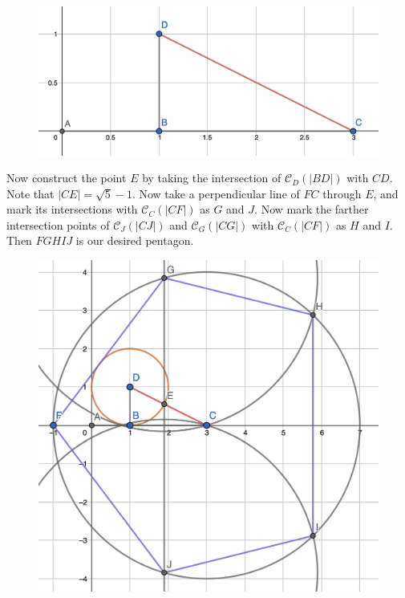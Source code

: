 \documentclass[twoside,10pt]{article}
\begin{document}
\begin{figure}[H]
	\centering
	\includegraphics[scale=0.3]{fig/33a}
\end{figure}

Now construct the point $E$ by taking the intersection of $\mathcal{C}_{D}(|BD|)$ with $CD$. Note that $|CE|=\sqrt{5} -1$. Now take a perpendicular line of $FC$ through $E$, and mark its intersections with $\mathcal{C}_{C}(|CF|)$ as $G$ and $J$. Now mark the farther intersection points of $\mathcal{C}_J(|CJ|)$ and $\mathcal{C}_{G}(|CG|)$ with $\mathcal{C}_C(|CF|)$ as $H$ and $I$. Then $FGHIJ$ is our desired pentagon.

\begin{figure}[H]
	\centering
	\includegraphics[scale=0.5]{fig/33b}
\end{figure}
\end{document}
